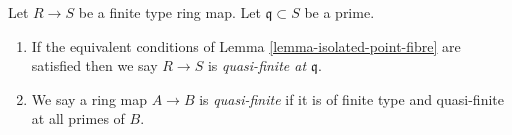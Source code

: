 \begin{definition}
\label{definition-quasi-finite}
Let $R \to S$ be a finite type ring map.
Let $\mathfrak q \subset S$ be a prime.
\begin{enumerate}
\item If the equivalent conditions of Lemma \ref{lemma-isolated-point-fibre}
are satisfied then we say $R \to S$ is {\it quasi-finite at $\mathfrak q$}.
\item We say a ring map $A \to B$ is {\it quasi-finite}
if it is of finite type and quasi-finite at all primes of $B$.
\end{enumerate}
\end{definition}